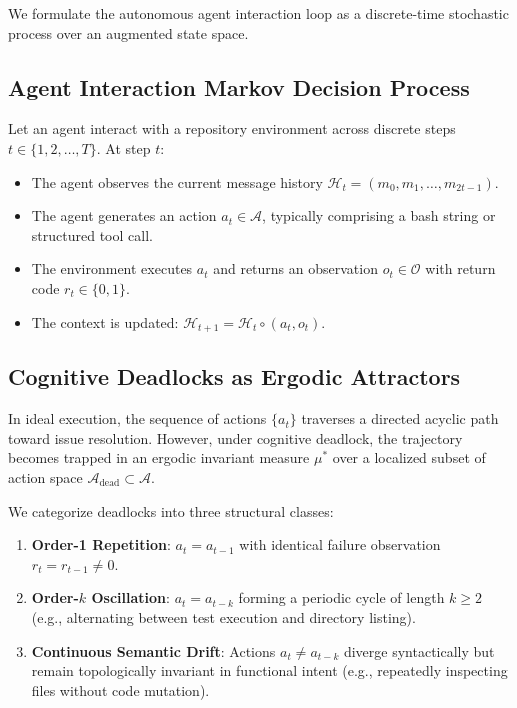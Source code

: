 \documentclass[journal]{IEEEtran}
\begin{document}
We formulate the autonomous agent interaction loop as a discrete-time stochastic process over an augmented state space.

\subsection{Agent Interaction Markov Decision Process}
Let an agent interact with a repository environment across discrete steps $t \in \{1, 2, \dots, T\}$. At step $t$:
\begin{itemize}[leftmargin=12pt, topsep=2pt, itemsep=1pt]
    \item The agent observes the current message history $\mathcal{H}_t = (m_0, m_1, \dots, m_{2t-1})$.
    \item The agent generates an action $a_t \in \mathcal{A}$, typically comprising a bash string or structured tool call.
    \item The environment executes $a_t$ and returns an observation $o_t \in \mathcal{O}$ with return code $r_t \in \{0, 1\}$.
    \item The context is updated: $\mathcal{H}_{t+1} = \mathcal{H}_t \circ (a_t, o_t)$.
\end{itemize}

\subsection{Cognitive Deadlocks as Ergodic Attractors}
In ideal execution, the sequence of actions $\{a_t\}$ traverses a directed acyclic path toward issue resolution. However, under cognitive deadlock, the trajectory becomes trapped in an ergodic invariant measure $\mu^*$ over a localized subset of action space $\mathcal{A}_{\text{dead}} \subset \mathcal{A}$.

We categorize deadlocks into three structural classes:
\begin{enumerate}[leftmargin=12pt, topsep=2pt, itemsep=1pt]
    \item \textbf{Order-1 Repetition}: $a_t = a_{t-1}$ with identical failure observation $r_t = r_{t-1} \neq 0$.
    \item \textbf{Order-$k$ Oscillation}: $a_t = a_{t-k}$ forming a periodic cycle of length $k \ge 2$ (e.g., alternating between test execution and directory listing).
    \item \textbf{Continuous Semantic Drift}: Actions $a_t \neq a_{t-k}$ diverge syntactically but remain topologically invariant in functional intent (e.g., repeatedly inspecting files without code mutation).
\end{enumerate}
\end{document}

